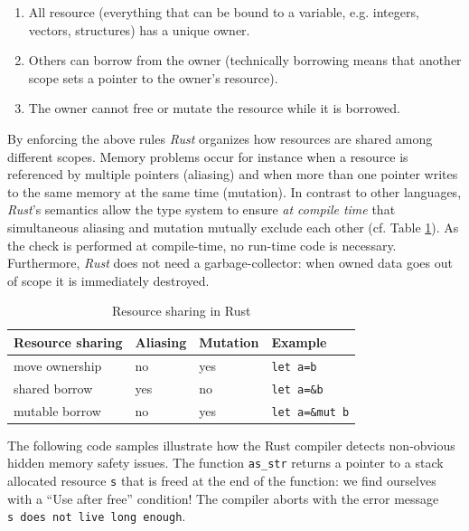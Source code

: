 \documentclass[final,5p,times,twocolumn]{elsarticle}
\begin{document}
\begin{enumerate}
\def\labelenumi{\arabic{enumi}.}
\item
  All resource (everything that can be bound to a variable, e.g.
  integers, vectors, structures) has a unique owner.

\item Others can borrow from the owner (technically borrowing means that another
scope sets a pointer to the owner's resource). 

\item
  The owner cannot free or mutate the resource while it is borrowed.
\end{enumerate}

By enforcing the above rules \emph{Rust} organizes how resources are shared
among different scopes. Memory problems occur for instance when a resource is
referenced by multiple pointers (aliasing) and when more than one pointer writes
to the same memory at the same time (mutation). In contrast to other languages,
\emph{Rust}'s semantics allow the type system to ensure \emph{at compile time}
that simultaneous aliasing and mutation mutually exclude each other (cf. Table
\ref{tab:resource-sharing-in-rust}). As the check is performed at compile-time,
no run-time code is necessary.  Furthermore, \emph{Rust} does not need a
garbage-collector: when owned data goes out of scope it is immediately
destroyed.

\begin{table}[htbp]
\begin{center}
\begin{tabular}{ | l | l | l | l | }
\hline
    Resource sharing      & Aliasing & Mutation & Example \\
\hline
    move ownership        & no       & yes      & \texttt{let a=b} \\
    shared borrow         & yes      & no       & \texttt{let a=\&b} \\
    mutable borrow        & no       & yes      & \texttt{let a=\&mut b} \\
\hline
\end{tabular}
\end{center}
    \caption{Resource sharing in Rust}
    \label{tab:resource-sharing-in-rust}
\end{table}

The following code samples \cite[Sec. 3.2]{the-rust-project-developers2017}
illustrate how the Rust compiler detects non-obvious hidden memory safety
issues. The function \texttt{as\_str} returns a pointer to a stack allocated
resource \texttt{s} that is freed at the end of the function: we find ourselves
with a ``Use after free'' condition! The compiler aborts with the error message
\texttt{s\ does\ not\ live long\ enough}.
\end{document}
